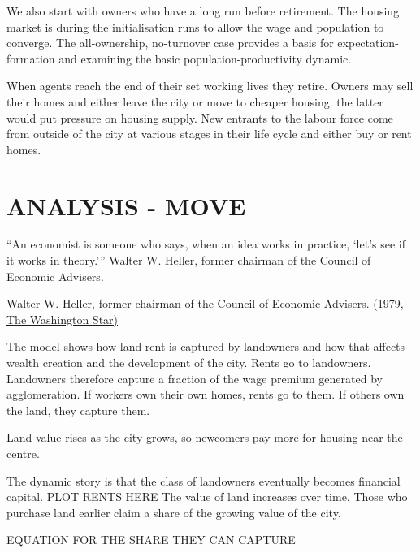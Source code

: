 We also start with owners who have a long run before retirement. The housing market is  during the initialisation runs to allow the wage and population to converge. The all-ownership, no-turnover case provides a basis for expectation-formation and examining the basic population-productivity dynamic. 

When agents reach the end of their set working lives they retire. %
Owners may sell their homes and either leave the city or move to cheaper housing. the latter would put pressure on housing supply. New entrants to the labour force come from outside of the city at various stages in their life cycle and either buy or rent homes. 

\section{ANALYSIS - MOVE}
\epigraph{``An economist is someone who says, when an idea works in practice, `let's see if it works in theory.'''
Walter W. Heller, former chairman of the Council of Economic Advisers.}{ Walter W. Heller, former chairman of the Council of Economic Advisers. (\href{https://quoteinvestigator.com/2015/08/30/practice/}{1979, The Washington Star)}}


The model shows how land rent is captured by landowners and how that affects wealth creation and the development of the city. 
Rents go to landowners. %
Landowners therefore capture a fraction of the wage premium generated by agglomeration.
If workers own their own homes, rents go to them. If others own the land, they capture them.

Land value rises as the city grows, so newcomers pay more for housing near the centre.

The dynamic story is that the class of landowners eventually becomes financial capital.
PLOT RENTS HERE
The value of land increases over time. Those who purchase land earlier claim a share of the growing value of the city. %
 
EQUATION FOR THE SHARE THEY CAN CAPTURE

